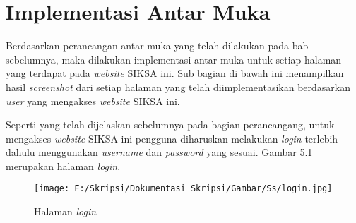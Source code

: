 \section{Implementasi Antar Muka}
\label{sec:implementasi_antar_muka}
Berdasarkan perancangan antar muka yang telah dilakukan pada bab sebelumnya, maka dilakukan implementasi antar muka untuk setiap halaman yang terdapat pada \textit{website} SIKSA ini. Sub bagian di bawah ini menampilkan hasil \textit{screenshot} dari setiap halaman yang telah diimplementasikan berdasarkan \textit{user} yang mengakses \textit{website} SIKSA ini.

Seperti yang telah dijelaskan sebelumnya pada bagian perancangang, untuk mengakses \textit{website} SIKSA ini pengguna diharuskan melakukan \textit{login} terlebih dahulu menggunakan \textit{username} dan \textit{password} yang sesuai. Gambar \hyperlink{login}{5.1} merupakan halaman \textit{login}.
\begin{figure}[H]
	\centering
		\texttt{[image: F:/Skripsi/Dokumentasi\_Skripsi/Gambar/Ss/login.jpg]}
		\caption{Halaman \textit{login}}
		\label{fig:login}
	\end{figure}


